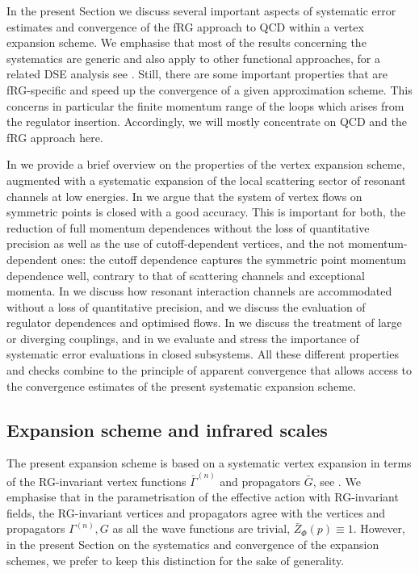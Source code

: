 \documentclass[aps,twocolumn,prd,superscriptaddress]{revtex4-2}
\begin{document}
In the present Section we discuss several important aspects of systematic error estimates and convergence of the fRG approach to QCD within a vertex expansion scheme. We emphasise that most of the results concerning the systematics are generic and also apply to other functional approaches, for a related DSE analysis see \cite{Lu:2023mkn}. Still, there are some important properties that are fRG-specific and speed up the convergence of a given approximation scheme. This concerns in particular the finite momentum range of the loops which arises from the regulator insertion. Accordingly, we will mostly concentrate on QCD and the fRG approach here. 

In  we provide a brief overview on the properties of the vertex expansion scheme, augmented with a systematic expansion of the local scattering sector of resonant channels at low energies. In  we argue that the system of vertex flows on symmetric points is closed with a good accuracy. This is important for both, the reduction of full momentum dependences without the loss of quantitative precision as well as the use of cutoff-dependent vertices, and the not momentum-dependent ones: the cutoff dependence captures the symmetric point momentum dependence well, contrary to that of scattering channels and exceptional momenta. In  we discuss how resonant interaction channels are accommodated without a loss of quantitative precision, and  we discuss the evaluation of regulator dependences and optimised flows. In  we discuss the treatment of large or diverging couplings, and in  we evaluate and stress the importance of systematic error evaluations in closed subsystems. All these different properties and checks combine to the principle of \textrm{apparent convergence} that allows access to the convergence estimates of the present systematic expansion scheme. 


\subsection{Expansion scheme and infrared scales} 
\label{sec:Expansion+Scales}

The present expansion scheme is based on a systematic vertex expansion in terms of the RG-invariant vertex functions $\bar \Gamma^{(n)}$ and propagators $\bar G$, see . We emphasise that in the parametrisation of the effective action with RG-invariant fields, the RG-invariant vertices and propagators agree with the vertices and propagators $\Gamma^{(n)}, G$ as all the wave functions are trivial, $\bar Z_\Phi(p)\equiv 1$. However, in the present Section on the systematics and convergence of the expansion schemes, we prefer to keep this distinction for the sake of generality. 
\end{document}
